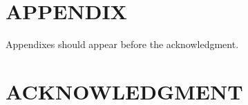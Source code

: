 \documentclass[letterpaper, 10 pt, conference]{ieeeconf}  %
\begin{document}
\addtolength{\textheight}{-12cm}   %







\section*{APPENDIX}

Appendixes should appear before the acknowledgment.

\section*{ACKNOWLEDGMENT}







\end{document}
